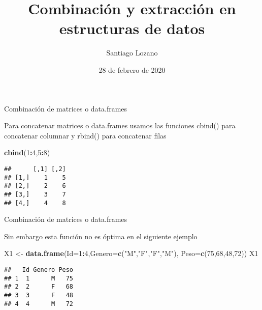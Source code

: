 \documentclass[ignorenonframetext,]{beamer}
\title{Combinación y extracción en estructuras de datos}
\author{Santiago Lozano}
\date{28 de febrero de 2020}
\newenvironment{Shaded}{\begin{snugshade}}{\end{snugshade}}
\newcommand{\KeywordTok}[1]{\textcolor[rgb]{0.13,0.29,0.53}{\textbf{#1}}}
\newcommand{\DataTypeTok}[1]{\textcolor[rgb]{0.13,0.29,0.53}{#1}}
\newcommand{\DecValTok}[1]{\textcolor[rgb]{0.00,0.00,0.81}{#1}}
\newcommand{\StringTok}[1]{\textcolor[rgb]{0.31,0.60,0.02}{#1}}
\newcommand{\OperatorTok}[1]{\textcolor[rgb]{0.81,0.36,0.00}{\textbf{#1}}}
\newcommand{\NormalTok}[1]{#1}
\begin{document}
\frame{\titlepage}

\begin{frame}[fragile]{Combinación de matrices o data.frames}

Para concatenar matrices o data.frames usamos las funciones cbind() para
concatenar columnar y rbind() para concatenar filas 

\begin{Shaded}
\begin{Highlighting}[]
\KeywordTok{cbind}\NormalTok{(}\DecValTok{1}\OperatorTok{:}\DecValTok{4}\NormalTok{,}\DecValTok{5}\OperatorTok{:}\DecValTok{8}\NormalTok{)}
\end{Highlighting}
\end{Shaded}

\begin{verbatim}
##      [,1] [,2]
## [1,]    1    5
## [2,]    2    6
## [3,]    3    7
## [4,]    4    8
\end{verbatim}

\end{frame}

\begin{frame}[fragile]{Combinación de matrices o data.frames}

Sin embargo esta función no es óptima en el siguiente ejemplo

\begin{Shaded}
\begin{Highlighting}[]
\NormalTok{X1 <-}\StringTok{ }\KeywordTok{data.frame}\NormalTok{(}\DataTypeTok{Id=}\DecValTok{1}\OperatorTok{:}\DecValTok{4}\NormalTok{,}\DataTypeTok{Genero=}\KeywordTok{c}\NormalTok{(}\StringTok{"M"}\NormalTok{,}\StringTok{"F"}\NormalTok{,}\StringTok{"F"}\NormalTok{,}\StringTok{"M"}\NormalTok{),}
                 \DataTypeTok{Peso=}\KeywordTok{c}\NormalTok{(}\DecValTok{75}\NormalTok{,}\DecValTok{68}\NormalTok{,}\DecValTok{48}\NormalTok{,}\DecValTok{72}\NormalTok{))}
\NormalTok{X1}
\end{Highlighting}
\end{Shaded}

\begin{verbatim}
##   Id Genero Peso
## 1  1      M   75
## 2  2      F   68
## 3  3      F   48
## 4  4      M   72
\end{verbatim}

\end{frame}
\end{document}

